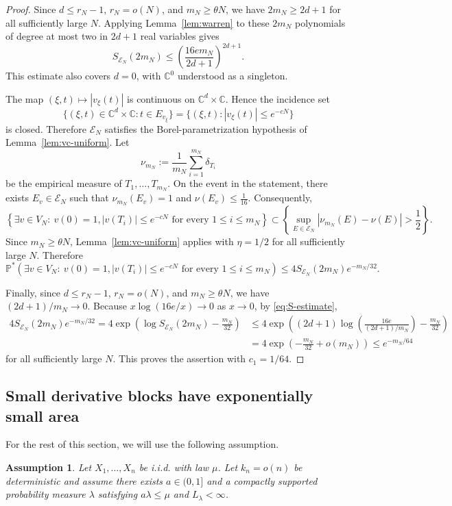 \documentclass[10pt,reqno]{amsart}
\newtheorem{assumption}[theorem]{Assumption}
\theoremstyle{remark}
\newcommand{\C}{\mathbb C}
\newcommand{\Prob}{\mathbb P}
\begin{document}
\begin{proof}
Since $d\le r_N-1$, $r_N=o(N)$, and $m_N\ge\theta N$, we have $2m_N\ge2d+1$ for all sufficiently large $N$. Applying Lemma~\ref{lem:warren} to these $2m_N$ polynomials of degree at most two in $2d+1$ real variables gives
\begin{equation}\label{eq:S-estimate}
    S_{\mathcal E_N}(2m_N) \le \left(\frac{16e m_N}{2d+1}\right)^{2d+1}.
\end{equation}
This estimate also covers $d=0$, with $\C^0$ understood as a singleton.

The map $(\xi,t)\longmapsto |v_\xi(t)|$ is continuous on $\C^d\times\C$. Hence the incidence set
\[\{(\xi,t)\in\C^d\times\C:t\in E_{v_\xi}\}
    =\{(\xi,t):|v_\xi(t)|\le e^{-cN}\}\]
is closed. Therefore $\mathcal E_N$ satisfies the Borel-parametrization
hypothesis of Lemma~\ref{lem:vc-uniform}. Let
\[\nu_{m_N}:=\frac{1}{m_N}\sum_{i=1}^{m_N}\delta_{T_i}\]
be the empirical measure of $T_1,\ldots,T_{m_N}$. On the event in the
statement, there exists $E_v\in\mathcal E_N$ such that $\nu_{m_N}(E_v)=1$ and $\nu(E_v)\le\frac1{16}$. Consequently,
\[\left\{\exists v\in V_N:\ v(0)=1, |v(T_i)|\le e^{-cN}
     \text{ for every }1\le i\le m_N\right\}
 \subset
 \left\{\sup_{E\in\mathcal E_N}|\nu_{m_N}(E)-\nu(E)|>\frac{1}{2}\right\}.\]
Since $m_N\ge\theta N$, Lemma~\ref{lem:vc-uniform} applies with
$\eta=1/2$ for all sufficiently large $N$. Therefore
\[\Prob^*\!\left(\exists v\in V_N:\ v(0)=1, |v(T_i)|\le e^{-cN}
     \text{ for every }1\le i\le m_N\right)
 \le 4S_{\mathcal E_N}(2m_N)e^{-m_N/32}.\]

Finally, since $d\le r_N-1$, $r_N=o(N)$, and $m_N\ge\theta N$, we have $(2d+1)/m_N\to 0$. Because $x\log(16e/x)\to 0$ as $x\to 0$, by \eqref{eq:S-estimate},
\begin{align*}
    4S_{\mathcal E_N}(2m_N)e^{-m_N/32}
    =4\exp\left(\log S_{\mathcal E_N}(2m_N)-\frac{m_N}{32}\right) 
    &\le
    4\exp\left((2d+1)\log\left(\frac{16e}{(2d+1)/m_N}\right)-\frac{m_N}{32}\right)\\
    &=4\exp\left(-\frac{m_N}{32}+o(m_N)\right)\le e^{-m_N/64}
\end{align*}
for all sufficiently large $N$. This proves the assertion with
$c_1=1/64$.
\end{proof}

\subsection{Small derivative blocks have exponentially small area}

For the rest of this section, we will use the following assumption.
\begin{assumption}\label{assump}
    Let $X_1,\ldots, X_n$ be i.i.d. with law $\mu$. Let $k_n=o(n)$ be deterministic and assume there exists $a\in (0,1]$ and a compactly supported probability measure $\lambda$ satisfying $a\lambda\le \mu$ and $L_\lambda<\infty$.
\end{assumption} %
\end{document}
